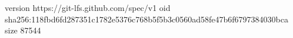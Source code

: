 version https://git-lfs.github.com/spec/v1
oid sha256:118fbd6fd287351c1782e5376c768b5f5b3c0560ad58fe47b6f6797384030bca
size 87544
